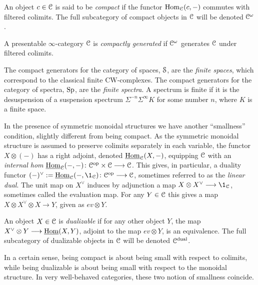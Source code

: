 \begin{definition}
    \label{ch0:def:compact-object}
    An object $c\in \EuScript{C}$ is said to be \emph{compact} if the functor $\operatorname{Hom}_{\EuScript{C}}(c,-)$ commutes with filtered colimits. The full subcategory of compact objects in $\EuScript{C}$ will be denoted $\EuScript{C}^\omega$.
\end{definition}

\begin{definition}
    \label{ch0:def:compactly-generated-category}
    A presentable $\infty$-category $\EuScript{C}$ is \emph{compactly generated} if $\EuScript{C}^\omega$ generates $\EuScript{C}$ under filtered colimits. 
\end{definition}

\begin{example}
    The compact generators for the category of spaces, $\EuScript{S}$, are the \emph{finite spaces}, which correspond to the classical finite CW-complexes. The compact generators for the category of spectra, $\mathrm{Sp}$, are the \emph{finite spectra}. A spectrum is finite if it is the desuspension of a suspension spectrum $\Sigma^{-n}\Sigma^\infty K$ for some number $n$, where $K$ is a finite space. 
\end{example}

In the presence of symmetric monoidal structures we have another ``smallness'' condition, slightly different from being compact. As the symmetric monoidal structure is assumed to preserve colimits separately in each variable, the functor $X\otimes (-)$ has a right adjoint, denoted $\operatorname{\underline{Hom}}_{\EuScript{C}}(X,-)$, equipping $\EuScript{C}$ with an \emph{internal hom} $\operatorname{\underline{Hom}}_{\EuScript{C}}(-,-)\colon \EuScript{C}^{\mathrm{op}}\times \EuScript{C}\longrightarrow \EuScript{C}$. This gives, in particular, a duality functor $(-)^\vee:=\iHom_\C(-,\1_\C)\: \C\op \to \C$, sometimes referred to as the \emph{linear dual}. The unit map on $X^\vee$ induces by adjunction a map $X\otimes X^\vee \to \1_\C$, sometimes called the evaluation map. For any $Y\in \EuScript{C}$ this gives a map $X\otimes X^\vee \otimes X\to Y$, given as $ev \otimes Y$. 

\begin{definition}
    \label{ch0:def:dualizable-object}
    An object $X\in \EuScript{C}$ is \emph{dualizable} if for any other object $Y$, the map $X^\vee\otimes Y\longrightarrow \operatorname{\underline{Hom}}(X,Y)$, adjoint to the map $ev\otimes Y$, is an equivalence. The full subcategory of dualizable objects in $\EuScript{C}$ will be denoted $\EuScript{C}^{\mathrm{dual}}$. 
\end{definition}

In a certain sense, being compact is about being small with respect to colimits, while being dualizable is about being small with respect to the monoidal structure. In very well-behaved categories, these two notion of smallness coincide. 

